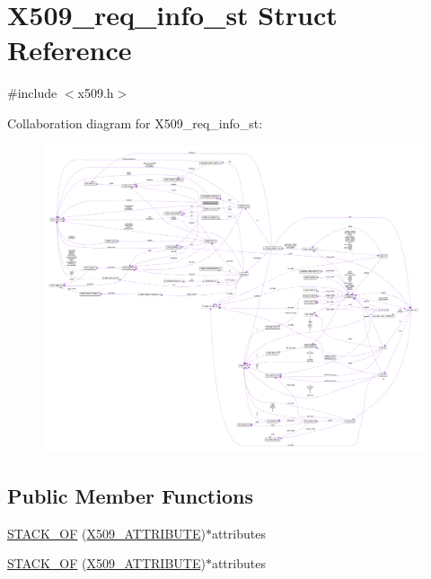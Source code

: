 \hypertarget{struct_x509__req__info__st}{}\section{X509\+\_\+req\+\_\+info\+\_\+st Struct Reference}
\label{struct_x509__req__info__st}


{\ttfamily \#include $<$x509.\+h$>$}



Collaboration diagram for X509\+\_\+req\+\_\+info\+\_\+st\+:\nopagebreak
\begin{figure}[H]
\begin{center}
\leavevmode
\includegraphics[width=350pt]{struct_x509__req__info__st__coll__graph}
\end{center}
\end{figure}
\subsection*{Public Member Functions}
\begin{DoxyCompactItemize}
\item 
\hyperlink{struct_x509__req__info__st_a68a742d5b82cbd7ef7e8fbbedbca6dc5}{S\+T\+A\+C\+K\+\_\+\+OF} (\hyperlink{crypto_2x509_2x509_8h_aa4f1a62a9d2dd8cb6780fe2713737c0f}{X509\+\_\+\+A\+T\+T\+R\+I\+B\+U\+TE})$\ast$attributes
\item 
\hyperlink{struct_x509__req__info__st_a68a742d5b82cbd7ef7e8fbbedbca6dc5}{S\+T\+A\+C\+K\+\_\+\+OF} (\hyperlink{crypto_2x509_2x509_8h_aa4f1a62a9d2dd8cb6780fe2713737c0f}{X509\+\_\+\+A\+T\+T\+R\+I\+B\+U\+TE})$\ast$attributes
\end{DoxyCompactItemize}
